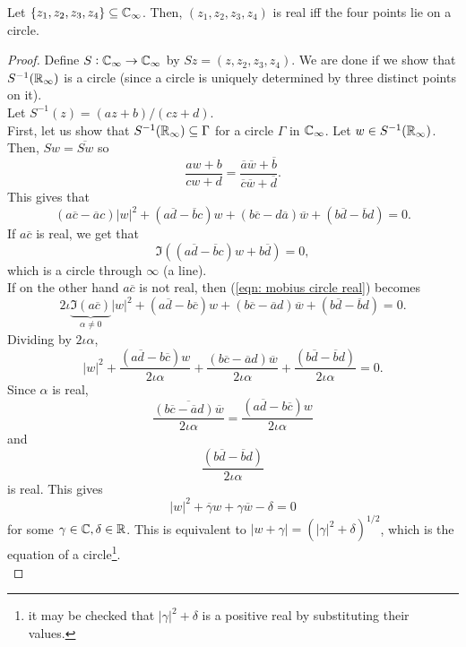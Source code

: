 	\begin{lemma}
		\label{thm: mobius real to circle}
		Let $\{z_1,z_2,z_3,z_4\} \subseteq \mathbb{C}_\infty$. Then, $(z_1,z_2,z_3,z_4)$ is real iff the four points lie on a circle.
	\end{lemma}
	\begin{proof}
		Define $S:\mathbb{C}_\infty\to\mathbb{C}_\infty$ by $Sz = (z,z_2,z_3,z_4)$. We are done if we show that $S^{-1}(\mathbb{R}_\infty)$ is a circle (since a circle is uniquely determined by three distinct points on it).\\
		Let $S^{-1}(z) = (az+b)/(cz+d)$.\\

		First, let us show that $S^{-1}(\mathbb{R}_\infty) \subseteq \Gamma$ for a circle $\Gamma$ in $\mathbb{C}_\infty$. Let $w \in S^{-1}(\mathbb{R}_\infty)$. Then, $Sw = \overline{Sw}$ so
		\[ \frac{aw+b}{cw+d} = \frac{\overline{a}\overline{w} + \overline{b}}{\overline{c}\overline{w} + \overline{d}}. \]
		This gives that
		\begin{equation}
			\tag{$*$}
			\label{eqn: mobius circle real}
			(a\overline{c} - \overline{a}c)|w|^2 + (a\overline{d} - \overline{b}c)w + (b\overline{c} - d\overline{a})\overline{w} + (b\overline{d} - \overline{b}d) = 0.
		\end{equation}
		If $a\overline{c}$ is real, we get that
		\[ \Im\left((a\overline{d}-\overline{b}c)w + b\overline{d}\right) = 0, \]
		which is a circle through $\infty$ (a line).\\
		If on the other hand $a\overline{c}$ is not real, then (\ref{eqn: mobius circle real}) becomes
		\[ 2\iota\underbrace{\Im(a\overline{c})}_{\alpha \ne 0}|w|^2 + (a\overline{d} - b\overline{c})w + (b\overline{c} - \overline{a}d)\overline{w} + (b\overline{d} - \overline{b}d) = 0. \]
		Dividing by $2\iota\alpha$,
		\[ |w|^2 + \frac{(a\overline{d} - b\overline{c})w}{2\iota\alpha} + \frac{(b\overline{c} - \overline{a}d)\overline{w}}{2\iota\alpha} + \frac{(b\overline{d} - \overline{b}d)}{2\iota\alpha} = 0. \]
		Since $\alpha$ is real,
		\[ \overline{\frac{(b\overline{c} - \overline{a}d)\overline{w}}{2\iota\alpha}} = \frac{(a\overline{d} - b\overline{c})w}{2\iota\alpha} \]
		and
		\[ \frac{(b\overline{d} - \overline{b}d)}{2\iota\alpha} \]
		is real. This gives
		\[ |w|^2 + \overline{\gamma}w + \gamma\overline{w} - \delta = 0 \]
		for some $\gamma \in \mathbb{C}, \delta \in \mathbb{R}$. This is equivalent to $|w+\gamma| = (|\gamma|^2 + \delta)^{1/2}$, which is the equation of a circle\footnote{it may be checked that $|\gamma|^2 + \delta$ is a positive real by substituting their values.}.\\


\end{proof}
